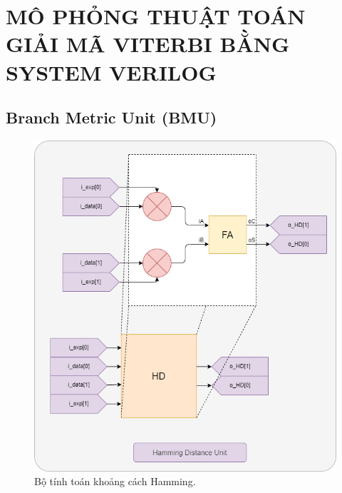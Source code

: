 \section{MÔ PHỎNG THUẬT TOÁN GIẢI MÃ VITERBI BẰNG SYSTEM VERILOG}

\subsection{Branch Metric Unit (BMU)}

\begin{figure}[H]
	\centering
	\includegraphics[width=.8\linewidth]{sections/pic/mophongbangSystemVerilog/HD_unit.png}
	\caption{Bộ tính toán khoảng cách Hamming.}
\end{figure}

